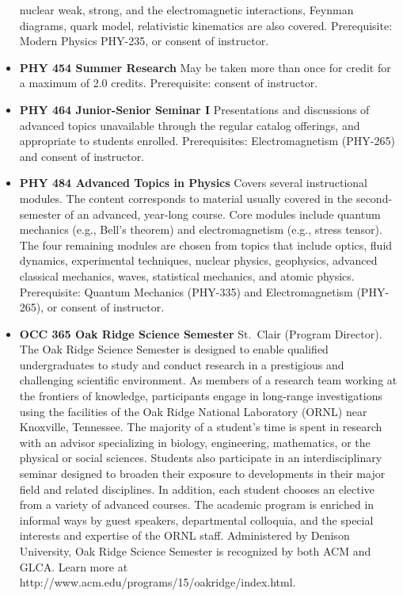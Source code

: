 \documentclass[
  letterpaper,
]{scrbook}
\begin{document}
\begin{itemize}
  nuclear weak, strong, and the electromagnetic interactions, Feynman
  diagrams, quark model, relativistic kinematics are also covered.
  Prerequisite: Modern Physics PHY-235, or consent of instructor.
\item
  \textbf{PHY 454 Summer Research} May be taken more than once for
  credit for a maximum of 2.0 credits. Prerequisite: consent of
  instructor.
\item
  \textbf{PHY 464 Junior-Senior Seminar I} Presentations and discussions
  of advanced topics unavailable through the regular catalog offerings,
  and appropriate to students enrolled. Prerequisites: Electromagnetism
  (PHY-265) and consent of instructor.
\item
  \textbf{PHY 484 Advanced Topics in Physics} Covers several
  instructional modules. The content corresponds to material usually
  covered in the second-semester of an advanced, year-long course. Core
  modules include quantum mechanics (e.g., Bell's theorem) and
  electromagnetism (e.g., stress tensor). The four remaining modules are
  chosen from topics that include optics, fluid dynamics, experimental
  techniques, nuclear physics, geophysics, advanced classical mechanics,
  waves, statistical mechanics, and atomic physics. Prerequisite:
  Quantum Mechanics (PHY-335) and Electromagnetism (PHY-265), or consent
  of instructor.
\item
  \textbf{OCC 365 Oak Ridge Science Semester} St.~Clair (Program
  Director). The Oak Ridge Science Semester is designed to enable
  qualified undergraduates to study and conduct research in a
  prestigious and challenging scientific environment. As members of a
  research team working at the frontiers of knowledge, participants
  engage in long-range investigations using the facilities of the Oak
  Ridge National Laboratory (ORNL) near Knoxville, Tennessee. The
  majority of a student's time is spent in research with an advisor
  specializing in biology, engineering, mathematics, or the physical or
  social sciences. Students also participate in an interdisciplinary
  seminar designed to broaden their exposure to developments in their
  major field and related disciplines. In addition, each student chooses
  an elective from a variety of advanced courses. The academic program
  is enriched in informal ways by guest speakers, departmental
  colloquia, and the special interests and expertise of the ORNL staff.
  Administered by Denison University, Oak Ridge Science Semester is
  recognized by both ACM and GLCA. Learn more at
  http://www.acm.edu/programs/15/oakridge/index.html.
\end{itemize}
\end{document}
